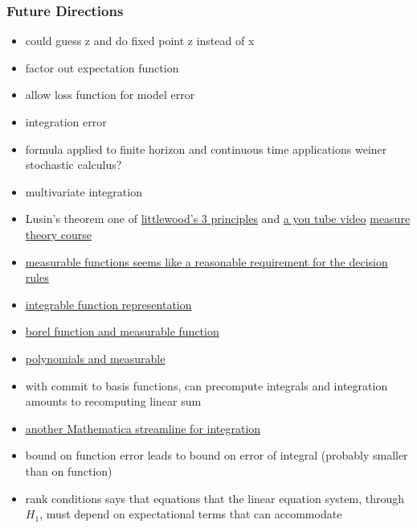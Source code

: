 \documentclass[tikz]{beamer}
\begin{document}
\begin{frame}
  \frametitle{Future Directions}
  \begin{itemize}
  \item could guess z and do fixed point z instead of x
  \item factor out expectation function
  \item allow loss function for model error
  \item integration error 
  \item formula applied to finite horizon and continuous time applications weiner stochastic calculus?
  \item multivariate integration
  \item Lusin's theorem one of \href{https://faculty.etsu.edu/gardnerr/5210/notes/3-3.pdf}{littlewood's 3 principles}   and \href{https://www.youtube.com/watch?v=-jOcbJpWttc}{a you tube video}  \href{http://web.maths.unsw.edu.au/~potapov/5825_2013/}{measure theory course }
  \item \href{http://math.stackexchange.com/questions/176379/approximation-of-bounded-measurable-functions-with-continuous-functions}{measurable functions seems like a reasonable requirement for the decision rules}
  \item \href{http://math.stackexchange.com/questions/76931/finding-simple-step-and-continuous-functions-to-satisfy-lebesgue-integral-cond}{integrable function representation}
  \item \href{http://math.stackexchange.com/questions/434239/measurable-function-approximated-by-borel-function}{borel function and measurable function}
  \item \href{http://math.stackexchange.com/questions/573158/approximate-a-complex-measurable-function-pointwisely-almost-everywhere-by-polyn}{polynomials and measurable}
  \item with commit to basis functions, can precompute integrals and 
integration amounts to recomputing linear sum
\item  \href{http://www.mathematica-journal.com/2008/11/dynamic-integration-of-interpolating-functions-and-some-concrete-optimal-stopping-problems/}{another Mathematica streamline for integration}
\item bound on function error leads to bound on error of integral (probably smaller than on function)
  \item rank conditions says that equations that the linear equation
system, through $H_1$,  must depend on expectational terms that can accommodate

\end{itemize}
\end{frame}
\end{document}
